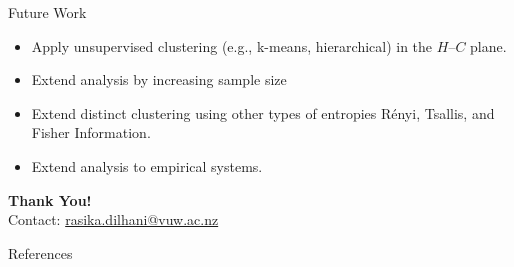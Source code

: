 \documentclass[11pt]{beamer}
\begin{document}
	\begin{frame}{Future Work}
		\begin{itemize}
			\item Apply unsupervised clustering (e.g., k-means, hierarchical) in the $H–C$ plane.
			\item Extend analysis by increasing sample size
			\item Extend distinct clustering using other types of entropies Rényi, Tsallis, and Fisher Information. 
			\item Extend analysis to empirical systems.
		\end{itemize}
	\end{frame}
	
	\begin{frame}[plain]
		\centering
		\Huge \textbf{Thank You!} \\
		\vspace{0.5cm}
		\small Contact: \href{mailto:rasika.dilhani@vuw.ac.nz}{rasika.dilhani@vuw.ac.nz}
	\end{frame}
	
	\begin{frame}[allowframebreaks]{References}
		
		
		
	\end{frame}
\end{document}
